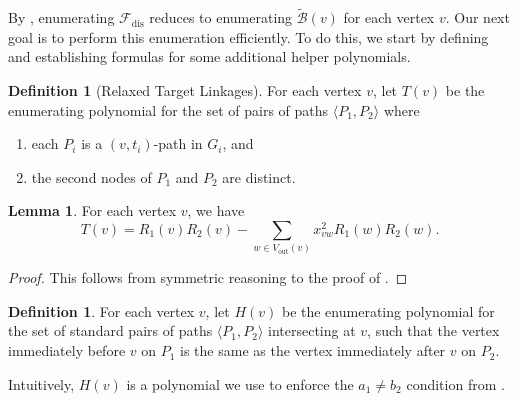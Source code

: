 \documentclass[11pt]{article}
\renewcommand{\t}{\text}
\newcommand{\vout}{V_{\t{out}}}
\newcommand{\Fdis}{\mathcal{F}_{\text{dis}}}
\theoremstyle{definition}
\newtheorem{lemma}[theorem]{Lemma}
\newtheorem{definition}[theorem]{Definition}
\begin{document}
By , enumerating $\Fdis$ reduces to enumerating $\tilde{\mathcal{B}}(v)$ for each vertex $v$.
Our next goal is to  perform this enumeration efficiently.
To do this, we start by defining and establishing formulas for  some additional helper polynomials.

\begin{definition}[Relaxed Target Linkages]
\label{def:relaxed-target}
For each vertex $v$, let $T(v)$ be the enumerating polynomial for the set of pairs of paths $\langle P_1,P_2\rangle$ where 
\begin{enumerate}
    \item each $P_i$ is a $(v,t_i)$-path in $G_i$, and
    \item the second nodes of $P_1$ and $P_2$ are distinct.
\end{enumerate} 
\end{definition}

\begin{lemma}
\label{target-relax}
    For each vertex $v$, we have 
       \[T(v) = R_1(v)R_2(v) - \sum_{w\in\vout(v)}x_{vw}^2R_1(w)R_2(w).\]
\end{lemma}
\begin{proof}
    This follows from symmetric reasoning to the proof of .
\end{proof}

\begin{definition}
\label{def:error-term}
    For each vertex $v$, let $H(v)$ be the enumerating polynomial for the set of standard pairs of paths $\langle P_1,P_2\rangle$ intersecting at $v$, such that the vertex immediately before $v$ on $P_1$ is the same as the vertex immediately after $v$ on $P_2$.
\end{definition}

Intuitively, $H(v)$ is a polynomial we use to enforce the $a_1\neq b_2$ condition from .
\end{document}
